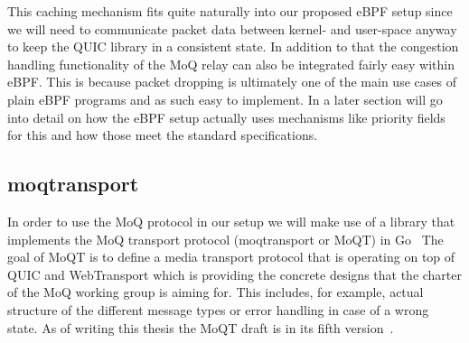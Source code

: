 This caching mechanism fits quite naturally into our proposed eBPF setup since we will need to 
communicate packet data between kernel- and user-space anyway to keep the QUIC library in a 
consistent state.
In addition to that the congestion handling functionality of the MoQ relay can also
be integrated fairly easy within eBPF\@.
This is because packet dropping is ultimately one of the main use cases of plain eBPF 
programs and as such easy to implement.
In a later section will go into detail on how the eBPF setup actually uses mechanisms like 
priority fields for this and how those meet the standard specifications.

\subsection{moqtransport}
In order to use the MoQ protocol in our setup we will make use of a library that implements 
the MoQ transport protocol (moqtransport or MoQT) in Go~\parencite{priority-moqtransport-repo}
The goal of MoQT is to define a media transport protocol that is operating on top
of QUIC and WebTransport which is providing the concrete designs that the charter of 
the MoQ working group is aiming for.
This includes, for example, actual structure of the different message types or error handling in case 
of a wrong state.
As of writing this thesis the MoQT draft is in its fifth version~\parencite{draft-moqtransport}.

